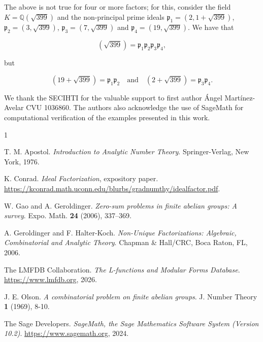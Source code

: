 \documentclass[11pt]{article}
\theoremstyle{definition}
\begin{document}
The above is not true for four or more factors; for this, consider the field $K=\mathbb{Q}(\sqrt{399})$ and the non-principal prime ideals $\mathfrak{p}_1=(2,1+\sqrt{399})$, $\mathfrak{p}_2=(3,\sqrt{399})$, $\mathfrak{p}_3=(7,\sqrt{399})$ and $\mathfrak{p}_4=(19,\sqrt{399})$. We have that 

\[ (\sqrt{399})=\mathfrak{p}_1\mathfrak{p}_2\mathfrak{p}_3\mathfrak{p}_4, \]

but 

\[ (19+\sqrt{399})=\mathfrak{p}_1\mathfrak{p}_2 \quad \text{and} \quad (2+\sqrt{399})=\mathfrak{p}_3\mathfrak{p}_4.  \]

\vskip20pt We thank the SECIHTI   for the valuable support to first author  Ángel Martínez-Avelar  CVU 1036860. The authors also acknowledge the use of SageMath \cite{Sage} for computational verification of the examples presented in this work.



\begin{thebibliography}{1}\footnotesize

 T. M. Apostol. {\it Introduction to Analytic Number Theory}. Springer-Verlag, New York, 1976.

 K. Conrad. {\it Ideal Factorization}, expository paper. \url{https://kconrad.math.uconn.edu/blurbs/gradnumthy/idealfactor.pdf}.


 W. Gao and A. Geroldinger. {\it Zero-sum problems in finite abelian groups: A survey}. Expo. Math. {\bf 24} (2006), 337--369.

 A. Geroldinger and F. Halter-Koch. {\it Non-Unique Factorizations: Algebraic, Combinatorial and Analytic Theory}. Chapman \& Hall/CRC, Boca Raton, FL, 2006.

 The LMFDB Collaboration. {\it The L-functions and Modular Forms Database}. \url{https://www.lmfdb.org}, 2026. 

 J. E. Olson. {\it A combinatorial problem on finite abelian groups}. J. Number Theory {\bf 1} (1969), 8-10.


 The Sage Developers. {\it SageMath, the Sage Mathematics Software System (Version 10.2)}. \url{https://www.sagemath.org}, 2024.

\end{thebibliography}
\end{document}
